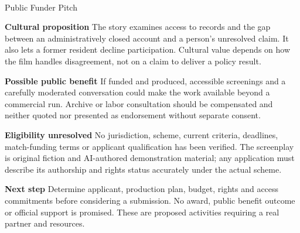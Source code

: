 \documentclass[11pt,letterpaper]{article}
\begin{document}
\begin{center}
{\Large\bfseries\sffamily \filmtitleupper}\\[6pt]
Public Funder Pitch
\end{center}
\textbf{Cultural proposition} The story examines access to records and the gap between an administratively closed account and a person's unresolved claim. It also lets a former resident decline participation. Cultural value depends on how the film handles disagreement, not on a claim to deliver a policy result.

\textbf{Possible public benefit} If funded and produced, accessible screenings and a carefully moderated conversation could make the work available beyond a commercial run. Archive or labor consultation should be compensated and neither quoted nor presented as endorsement without separate consent.

\textbf{Eligibility unresolved} No jurisdiction, scheme, current criteria, deadlines, match-funding terms or applicant qualification has been verified. The screenplay is original fiction and AI-authored demonstration material; any application must describe its authorship and rights status accurately under the actual scheme.

\textbf{Next step} Determine applicant, production plan, budget, rights and access commitments before considering a submission. No award, public benefit outcome or official support is promised. These are proposed activities requiring a real partner and resources.
\end{document}
